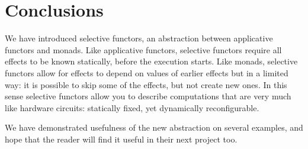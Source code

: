 \section{Conclusions}\label{sec-conclusions}

We have introduced selective functors, an abstraction between applicative
functors and monads. Like applicative functors, selective functors require all
effects to be known statically, before the execution starts. Like monads,
selective functors allow for effects to depend on values of earlier effects but
in a limited way: it is possible to skip some of the effects, but not create
new ones. In this sense selective functors allow you to describe computations
that are very much like hardware circuits: statically fixed, yet dynamically
reconfigurable.

We have demonstrated usefulness of the new abstraction on several examples, and
hope that the reader will find it useful in their next project too.
